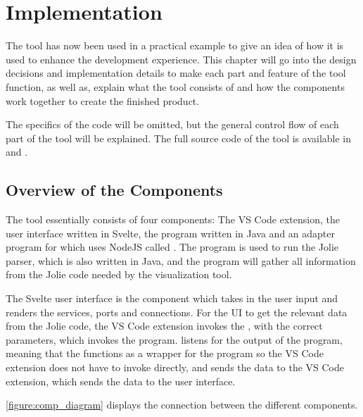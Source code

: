 \chapter{Implementation}
The tool has now been used in a practical example to give an idea of how it is used to enhance the development experience.
This chapter will go into the design decisions and implementation details to make each part and feature of the tool function, as well as,
explain what the tool consists of and how the components work together to create the finished product.

The specifics of the code will be omitted, but the general control flow of each part of the tool will be explained. The full source code of the tool
is available in \cite{jv} and \cite{vscode-jv}. 

\section{Overview of the Components}
The tool essentially consists of four components: The VS Code extension, the user interface written in Svelte, the \javatoolname[] program written in Java and an adapter program for \javatoolname[] which uses NodeJS called \nodetoolname[].
The \javatoolname[] program is used to run the Jolie parser, which is also written in Java, and the program will gather all information from the Jolie code needed by the visualization tool.

The Svelte user interface is the component which takes in the user input and renders the services, ports and connections.
For the UI to get the relevant data from the Jolie code, the VS Code extension invokes the \nodetoolname[], with the correct parameters, which invokes the \javatoolname[] program.
\nodetoolname[] listens for the output of the \javatoolname[] program,
meaning that the \nodetoolname[] functions as a wrapper for the \javatoolname[] program so the VS Code extension does not have to invoke \javatoolname[] directly,
and sends the data to the VS Code extension, which sends the data to the user interface.

\cref{figure:comp_diagram} displays the connection between the different components.

